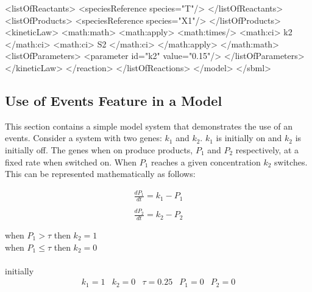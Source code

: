 \documentclass[10pt]{cekarticle}
\begin{document}
\begin{example}
                <listOfReactants>
                    <speciesReference species="T"/>
                </listOfReactants>
                <listOfProducts>
                    <speciesReference species="X1"/>
                </listOfProducts>
                <kineticLaw>
                    <math:math>
                        <math:apply>
                            <math:times/>
                            <math:ci> k2 </math:ci>
                            <math:ci> S2 </math:ci>
                        </math:apply>
                    </math:math>
                    <listOfParameters>
                        <parameter id="k2" value="0.15"/>
                    </listOfParameters>
                </kineticLaw>
            </reaction>
        </listOfReactions>
    </model>
</sbml>
\end{example}

\subsection{Use of Events Feature in a Model}
\label{sec:eventeg}
This section contains a simple model system that demonstrates the
use of an events.  Consider a system with two genes: $k_1$ and
$k_2$.  $k_1$ is initially on and $k_2$ is initially off.  The
genes when on produce products, $P_1$ and $P_2$ respectively, at a
fixed rate when switched on.  When $P_1$ reaches a given
concentration $k_2$ switches.  This can be represented
mathematically as follows:

\begin{equation*}
  \begin{array}{l}
    \frac{d P_1}{d t} = k_1 - P_1\\ \\[-4pt]
    \frac{d P_2}{d t} = k_2 - P_2\\ \\[-4pt]
  \end{array}
\end{equation*}
when $P_1 > \tau$ then $k_2 = 1$ \\
when $P_1 \leq \tau$ then $k_2 = 0$ \\
\\
initially
\begin{equation*}
  \begin{array}{lllll}
    k_1 = 1 & k_2 = 0 & \tau = 0.25 & P_1 = 0 & P_2 = 0\\ \\[-4pt]
  \end{array}
\end{equation*}
\end{document}
